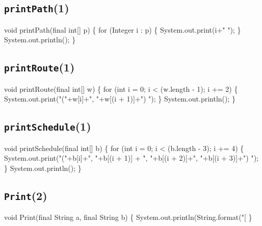 \subsection{\texttt{printPath}(1)}
\nwenddocs{}\endmoddef{}
void printPath(final int[] p) \{
  for (Integer i : p) \{
    System.out.print(i+" ");
  \}
  System.out.println();
\}
\eatline
{}\nwendcode{}\nwdocspar
\subsection{\texttt{printRoute}(1)}
\nwenddocs{}\endmoddef{}
void printRoute(final int[] w) \{
  for (int i = 0; i < (w.length - 1); i += 2) \{
    System.out.print("("+w[i]+", "+w[(i + 1)]+") ");
  \}
  System.out.println();
\}
\eatline
{}\nwendcode{}\nwdocspar
\subsection{\texttt{printSchedule}(1)}
\nwenddocs{}\endmoddef{}
void printSchedule(final int[] b) \{
  for (int i = 0; i < (b.length - 3); i += 4) \{
    System.out.print("("+b[i]+", "+b[(i + 1)]
      + ", "+b[(i + 2)]+", "+b[(i + 3)]+") ");
  \}
  System.out.println();
\}
\eatline
{}\nwendcode{}\nwdocspar

\subsection{\texttt{Print}(2)}
\nwenddocs{}\endmoddef{}
void Print(final String a, final String b) \{
  System.out.println(String.format("[%
\}
\eatline
{}\nwendcode{}\nwdocspar
